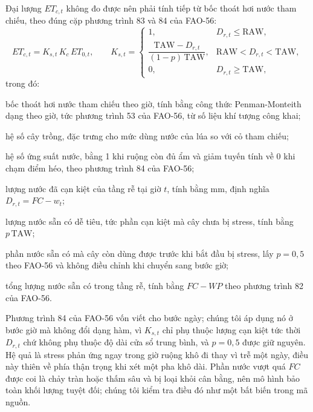 Đại lượng $ET_{c,t}$ không đo được nên phải tính tiếp từ bốc thoát hơi nước tham
chiếu, theo đúng cặp phương trình 83 và 84 của FAO-56:
\begin{equation}
ET_{c,t}=K_{s,t}\,K_c\,ET_{0,t},
\qquad
K_{s,t}=\begin{cases}
1, & D_{r,t}\le\mathrm{RAW},\\
\dfrac{\mathrm{TAW}-D_{r,t}}{(1-p)\,\mathrm{TAW}},
  & \mathrm{RAW}<D_{r,t}<\mathrm{TAW},\\
0, & D_{r,t}\ge\mathrm{TAW},
\end{cases}
\label{eq:etc}
\end{equation}
trong đó:
\begin{symbolist}
\item[$ET_{0,t}$] bốc thoát hơi nước tham chiếu theo giờ, tính bằng công thức
  Penman-Monteith dạng theo giờ, tức phương trình 53 của FAO-56, từ số liệu khí
  tượng công khai;
\item[$K_c$] hệ số cây trồng, đặc trưng cho mức dùng nước của lúa so với cỏ tham
  chiếu;
\item[$K_{s,t}$] hệ số ứng suất nước, bằng 1 khi ruộng còn đủ ẩm và giảm
  tuyến tính về 0 khi chạm điểm héo, theo phương trình 84 của FAO-56;
\item[$D_{r,t}$] lượng nước đã cạn kiệt của tầng rễ tại giờ $t$, tính bằng mm,
  định nghĩa $D_{r,t}=FC-w_t$;
\item[$\mathrm{RAW}$] lượng nước sẵn có dễ tiêu, tức phần cạn kiệt mà
  cây chưa bị stress, tính bằng $p\,\mathrm{TAW}$;
\item[$p$] phần nước sẵn có mà cây còn dùng được trước khi bắt đầu bị stress,
  lấy $p=0{,}5$ theo FAO-56 và không điều chỉnh khi chuyển sang bước giờ;
\item[$\mathrm{TAW}$] tổng lượng nước sẵn có trong tầng rễ, tính bằng
  $FC-WP$ theo phương trình 82 của FAO-56.
\end{symbolist} Phương trình 84 của FAO-56 vốn viết cho bước ngày; chúng tôi áp dụng nó ở bước
giờ mà không đổi dạng hàm, vì $K_{s,t}$ chỉ phụ thuộc lượng cạn kiệt tức thời
$D_{r,t}$ chứ không phụ thuộc độ dài cửa sổ trung bình, và $p=0{,}5$ được giữ
nguyên. Hệ quả là stress phản ứng ngay trong giờ ruộng khô đi thay vì trễ một
ngày, điều này thiên về phía thận trọng khi xét một pha khô dài.
Phần nước vượt quá $FC$ được coi là chảy tràn hoặc thấm sâu và bị loại khỏi cân
bằng, nên mô hình bảo toàn khối lượng tuyệt đối; chúng tôi kiểm tra điều đó như
một bất biến trong mã nguồn.

